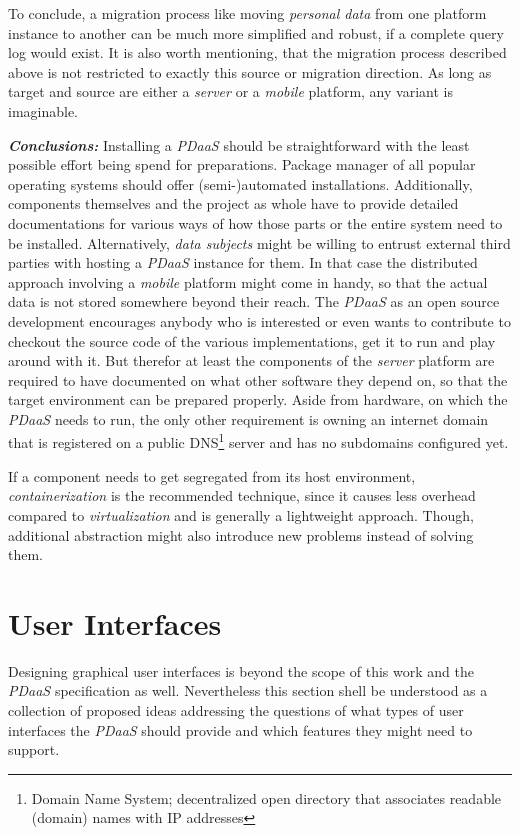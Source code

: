 \documentclass[12pt,english,a4paper,titlepage,cleardoublepage=empty,dottedtoc]{report}
\begin{document}
To conclude, a migration process like moving \emph{personal data} from
one platform instance to another can be much more simplified and robust,
if a complete query log would exist. It is also worth mentioning, that
the migration process described above is not restricted to exactly this
source or migration direction. As long as target and source are either a
\emph{server} or a \emph{mobile} platform, any variant is imaginable.

\emph{\textbf{Conclusions:}} Installing a \emph{PDaaS} should be
straightforward with the least possible effort being spend for
preparations. Package manager of all popular operating systems should
offer (semi-)automated installations. Additionally, components
themselves and the project as whole have to provide detailed
documentations for various ways of how those parts or the entire system
need to be installed. Alternatively, \emph{data subjects} might be
willing to entrust external third parties with hosting a \emph{PDaaS}
instance for them. In that case the distributed approach involving a
\emph{mobile} platform might come in handy, so that the actual data is
not stored somewhere beyond their reach. The \emph{PDaaS} as an open
source development encourages anybody who is interested or even wants to
contribute to checkout the source code of the various implementations,
get it to run and play around with it. But therefor at least the
components of the \emph{server} platform are required to have documented
on what other software they depend on, so that the target environment
can be prepared properly. Aside from hardware, on which the \emph{PDaaS}
needs to run, the only other requirement is owning an internet domain
that is registered on a public DNS\footnote{Domain Name System;
  decentralized open directory that associates readable (domain) names
  with IP addresses} server and has no subdomains configured yet.

If a component needs to get segregated from its host environment,
\emph{containerization} is the recommended technique, since it causes
less overhead compared to \emph{virtualization} and is generally a
lightweight approach. Though, additional abstraction might also
introduce new problems instead of solving them.

\section{User Interfaces}\label{user-interfaces}

Designing graphical user interfaces is beyond the scope of this work and
the \emph{PDaaS} specification as well. Nevertheless this section shell
be understood as a collection of proposed ideas addressing the questions
of what types of user interfaces the \emph{PDaaS} should provide and
which features they might need to support.
\end{document}
